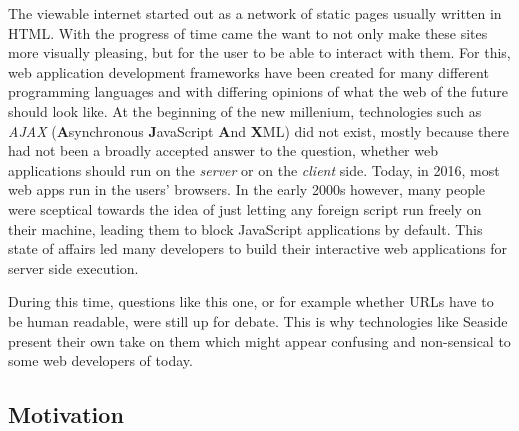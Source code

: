 \documentclass[a4paper,12pt,pagesize,headsepline,oribibl,titlepage]{scrartcl}
\begin{document}
The viewable internet started out as a network of static pages usually written in HTML. With the progress of time came the want to not only make these sites more visually pleasing, but for the user to be able to interact with them. For this, web application development frameworks have been created for many different programming languages and with differing opinions of what the web of the future should look like. At the beginning of the new millenium, technologies such as \emph{AJAX} (\textbf{A}synchronous \textbf{J}avaScript \textbf{A}nd \textbf{X}ML) did not exist, mostly because there had not been a broadly accepted answer to the question, whether web applications should run on the \emph{server} or on the \emph{client} side. Today, in 2016, most web apps run in the users' browsers. In the early 2000s however, many people were sceptical towards the idea of just letting any foreign script run freely on their machine, leading them to block JavaScript applications by default. This state of affairs led many developers to build their interactive web applications for server side execution. 

During this time, questions like this one, or for example whether URLs have to be human readable, were still up for debate. This is why technologies like Seaside present their own take on them which might appear confusing and non-sensical to some web developers of today. 


\subsection{Motivation}
\label{sec:motivation} 
\medskip

\bigskip
\end{document}
